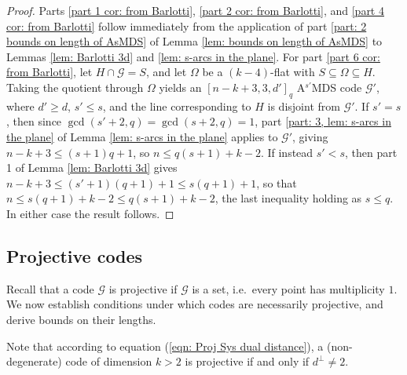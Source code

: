 \documentclass[11pt,a4paper]{amsart}
\newcommand{\G}{\mathcal{G}}
\theoremstyle{plain}
\theoremstyle{definition}
\theoremstyle{remark}
\begin{document}
	\begin{proof}
		Parts \ref{part 1 cor: from Barlotti}, \ref{part 2 cor: from Barlotti},  and \ref{part 4 cor: from Barlotti} follow immediately from the application of part \ref{part: 2 bounds on length of AsMDS} of Lemma \ref{lem: bounds on length of AsMDS} to Lemmas \ref{lem: Barlotti 3d}  and \ref{lem: s-arcs in the plane}.
		For part \ref{part 6 cor: from Barlotti}, let $H\cap \G=S$, and let $\Omega$ be a $(k-4)$-flat with $S\subseteq \Omega\subseteq H$. Taking the quotient through $\Omega$ yields an $[n-k+3, 3,d']_q$ A$^{s'}$MDS code $\G'$, where $d'\ge d$, $s'\le s$, and the line corresponding to $H$ is disjoint from $\G'$. If $s'=s$, then since $\gcd(s'+2,q)=\gcd(s+2,q)=1$, part \ref{part: 3, lem: s-arcs in the plane} of Lemma \ref{lem: s-arcs in the plane} applies to $\G'$, giving $n-k+3\le (s+1)q+1$, so $n\le q(s+1)+k-2$. If instead $s'<s$, then part 1 of Lemma \ref{lem: Barlotti 3d} gives $n-k+3\le (s'+1)(q+1)+1\le s(q+1)+1$, so that $n\le s(q+1)+k-2\le q(s+1)+k-2$, the last inequality holding as $s\le q$. In either case the result follows.
	\end{proof}

	\subsection{Projective codes}

	Recall that a code $\G$ is projective if $\mathcal{G}$ is a set, i.e.\ every point has multiplicity $1$. We now establish conditions under which codes are necessarily projective, and derive bounds on their lengths.

	Note that according to equation (\ref{eqn: Proj Sys dual distance}), a (non-degenerate) code of dimension $k>2$ is projective if and only if $d^\perp\ne 2$.
\end{document}
